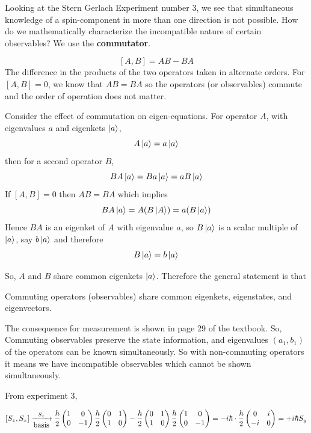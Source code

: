 \documentclass[english, 11pt]{article}
\begin{document}
      Looking at the Stern Gerlach Experiment number 3, we see that simultaneous knowledge of a spin-component in more than one direction is not possible. How do we mathematically characterize the incompatible nature of certain observables? We use the \textbf{commutator}.

      \begin{defn}[commutator]\label{commutator}
        \[ [A, B] = AB - BA \]
        The difference in the products of the two operators taken in alternate orders. For $[A,B] = 0$, we know that $AB = BA$ so the operators (or observables) commute and the order of operation does not matter.
      \end{defn}

      Consider the effect of commutation on eigen-equations. For operator $A$, with eigenvalues $a$ and eigenkets $\left|a\right\rangle$,
      \[ A\left|a\right\rangle = a\left|a\right\rangle \]
      then for a second operator $B$,
      \[ BA\left|a\right\rangle = Ba\left|a\right\rangle = aB\left|a\right\rangle \]
      If $[A,B] = 0$ then $AB = BA$ which implies
      \[ BA\left|a\right\rangle = A(B\left|A\right\rangle) = a(B\left|a\right\rangle) \]
      Hence $BA$ is an eigenket of $A$ with eigenvalue $a$, so $B\left|a\right\rangle$ is a scalar multiple of $\left|a\right\rangle$, say $b\left|a\right\rangle$ and therefore
      \[ B\left|a\right\rangle = b\left|a\right\rangle \]

      So, $A$ and $B$ share common eigenkets $\left|a\right\rangle$. Therefore the general statement is that

      \begin{thrm}
      Commuting operators (observables) share common eigenkets, eigenstates, and eigenvectors.
      \end{thrm}

       The consequence for measurement is shown in page 29 of the textbook. So, Commuting observables preserve the state information, and eigenvalues $(a_1,b_1)$ of the operators can be known simultaneously. So with non-commuting operators it means we have incompatible observables which cannot be shown simultaneously.\newline

       From experiment 3,

       \[ [S_z,S_x] \xrightarrow[\mbox{basis}]{S_z} \frac{\hbar}{2}\left(\begin{matrix}1 & 0 \\ 0 & -1\end{matrix}\right)\frac{\hbar}{2}\left(\begin{matrix}0 & 1 \\ 1 & 0\end{matrix}\right) - \frac{\hbar}{2}\left(\begin{matrix}0 & 1 \\ 1 & 0\end{matrix}\right)\frac{\hbar}{2}\left(\begin{matrix}1 & 0 \\ 0 & -1\end{matrix}\right) = -i\hbar\cdot\frac{\hbar}{2}\left(\begin{matrix}0 & i \\ -i & 0\end{matrix}\right) = +i\hbar S_y \]
\end{document}
